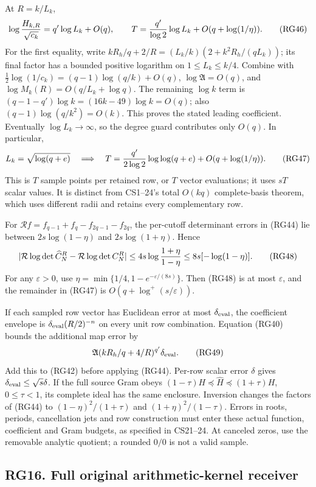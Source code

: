 \documentclass[11pt]{article}
\begin{document}
At \(R=k/L_k\), \[
\log{H_{k,R}\over\sqrt{c_k}}=q'\log L_k+O(q),\qquad
T={q'\over\log2}\log L_k+O(q+\log(1/\eta)).
\tag{RG46}
\] For the first equality, write \(kR_h/q+2/R=(L_k/k)(2+k^2R_h/(qL_k))\); its final factor has a bounded positive logarithm on \(1\le L_k\le k/4\). Combine with \(\frac12\log(1/c_k)=(q-1)\log(q/k)+O(q)\), \(\log\mathfrak A=O(q)\), and \(\log M_k(R)=O(q/L_k+\log q)\). The remaining \(\log k\) term is \((q-1-q')\log k=(16k-49)\log k=O(q)\); also \((q-1)\log(q/k^2)=O(k)\). This proves the stated leading coefficient. Eventually \(\log L_k\to\infty\), so the degree guard contributes only \(O(q)\). In particular, \[
L_k=\sqrt{\log(q+e)}
\quad\Longrightarrow\quad
T={q'\over2\log2}\log\log(q+e)+O(q+\log(1/\eta)).
\tag{RG47}
\] This is \(T\) sample points per retained row, or \(T\) vector evaluations; it uses \(sT\) scalar values. It is distinct from CS1--24's total \(O(kq)\) complete-basis theorem, which uses different radii and retains every complementary row.

For \(\mathcal Rf=f_{q-1}+f_q-f_{2q-1}-f_{2q}\), the per-cutoff determinant errors in (RG44) lie between \(2s\log(1-\eta)\) and \(2s\log(1+\eta)\). Hence \[
|\mathcal R\log\det\widehat C_N^R-\mathcal R\log\det C_N^R|
\le4s\log{1+\eta\over1-\eta}\le8s[-\log(1-\eta)].
\tag{RG48}
\] For any \(\varepsilon>0\), use \(\eta=\min\{1/4,1-e^{-\varepsilon/(8s)}\}\). Then (RG48) is at most \(\varepsilon\), and the remainder in (RG47) is \(O(q+\log^+(s/\varepsilon))\).

If each sampled row vector has Euclidean error at most \(\delta_{\rm eval}\), the coefficient envelope is \(\delta_{\rm eval}(R/2)^{-n}\) on every unit row combination. Equation (RG40) bounds the additional map error by \[
\mathfrak A(kR_h/q+4/R)^{q'}\delta_{\rm eval}.
\tag{RG49}
\] Add this to (RG42) before applying (RG44). Per-row scalar error \(\delta\) gives \(\delta_{\rm eval}\le\sqrt{s}\delta\). If the full source Gram obeys \((1-\tau)H\preceq\widehat H\preceq(1+\tau)H\), \(0\le\tau<1\), its complete ideal has the same enclosure. Inversion changes the factors of (RG44) to \((1-\eta)^2/(1+\tau)\) and \((1+\eta)^2/(1-\tau)\). Errors in roots, periods, cancellation jets and row construction must enter these actual function, coefficient and Gram budgets, as specified in CS21--24. At canceled zeros, use the removable analytic quotient; a rounded \(0/0\) is not a valid sample.

\subsection{RG16. Full original arithmetic-kernel receiver}\label{rg16.-full-original-arithmetic-kernel-receiver}
\end{document}
